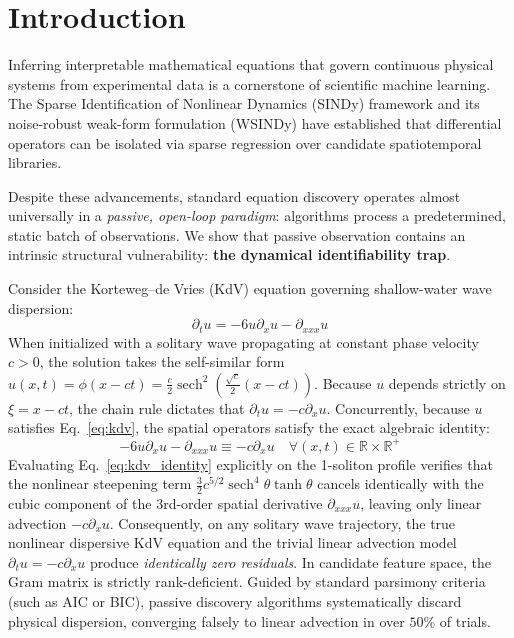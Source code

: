 \documentclass[twocolumn,10pt,a4paper]{article}
\begin{document}
\section{Introduction}
Inferring interpretable mathematical equations that govern continuous physical systems from experimental data is a cornerstone of scientific machine learning. The Sparse Identification of Nonlinear Dynamics (SINDy) framework \cite{brunton2016discovering, desilva2020pysindy} and its noise-robust weak-form formulation (WSINDy) \cite{schaeffer2017learning, messenger2021weak} have established that differential operators can be isolated via sparse regression over candidate spatiotemporal libraries.

Despite these advancements, standard equation discovery operates almost universally in a \emph{passive, open-loop paradigm}: algorithms process a predetermined, static batch of observations. We show that passive observation contains an intrinsic structural vulnerability: \textbf{the dynamical identifiability trap}.

Consider the Korteweg--de Vries (KdV) equation governing shallow-water wave dispersion:
\begin{equation}
\partial_t u = -6 u \partial_x u - \partial_{xxx} u
\label{eq:kdv}
\end{equation}
When initialized with a solitary wave propagating at constant phase velocity $c > 0$, the solution takes the self-similar form $u(x, t) = \phi(x - ct) = \frac{c}{2} \operatorname{sech}^2\left(\frac{\sqrt{c}}{2}(x - ct)\right)$. Because $u$ depends strictly on $\xi = x - ct$, the chain rule dictates that $\partial_t u = -c \partial_x u$. Concurrently, because $u$ satisfies Eq.~\eqref{eq:kdv}, the spatial operators satisfy the exact algebraic identity:
\begin{equation}
-6 u \partial_x u - \partial_{xxx} u \equiv -c \partial_x u \quad \forall (x, t) \in \mathbb{R} \times \mathbb{R}^+
\label{eq:kdv_identity}
\end{equation}
Evaluating Eq.~\eqref{eq:kdv_identity} explicitly on the 1-soliton profile verifies that the nonlinear steepening term $\frac{3}{2} c^{5/2} \operatorname{sech}^4\theta \tanh\theta$ cancels identically with the cubic component of the 3rd-order spatial derivative $\partial_{xxx} u$, leaving only linear advection $-c \partial_x u$. Consequently, on any solitary wave trajectory, the true nonlinear dispersive KdV equation and the trivial linear advection model $\partial_t u = -c \partial_x u$ produce \emph{identically zero residuals}. In candidate feature space, the Gram matrix is strictly rank-deficient. Guided by standard parsimony criteria (such as AIC or BIC), passive discovery algorithms systematically discard physical dispersion, converging falsely to linear advection in over $50\%$ of trials.
\end{document}
